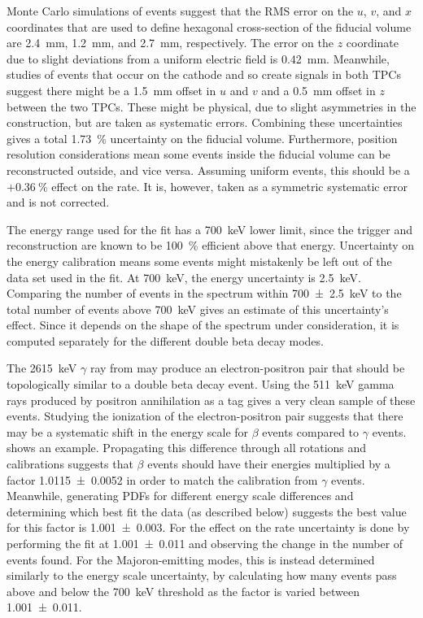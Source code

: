 \documentclass[herrin-thesis.tex]{subfiles}
\begin{document}
Monte Carlo simulations of \twonu{} events suggest that the RMS error on the \(u\), \(v\), and \(x\) coordinates that are used to define hexagonal cross-section of the fiducial volume are \SI{2.4}{\mm}, \SI{1.2}{\mm}, and \SI{2.7}{\mm}, respectively. The error on the \(z\) coordinate due to slight deviations from a uniform electric field is \SI{0.42}{\mm}. Meanwhile, studies of events that occur on the cathode and so create signals in both TPCs suggest there might be a \SI{1.5}{\mm} offset in \(u\) and \(v\) and a \SI{0.5}{\mm} offset in \(z\) between the two TPCs. These might be physical, due to slight asymmetries in the construction, but are taken as systematic errors. Combining these uncertainties gives a total \SI{1.73}{\percent} uncertainty on the fiducial volume. Furthermore, position resolution considerations mean some events inside the fiducial volume can be reconstructed outside, and vice versa. Assuming uniform events, this should be a \(+\SI{0.36}{\percent}\) effect on the rate. It is, however, taken as a symmetric systematic error and is not corrected.

The energy range used for the fit has a \SI{700}{\keV} lower limit, since the trigger and reconstruction are known to be \SI{100}{\percent} efficient above that energy. Uncertainty on the energy calibration means some events might mistakenly be left out of the data set used in the fit. At \SI{700}{\keV}, the energy uncertainty is \SI{2.5}{\keV}. Comparing the number of events in the spectrum within \SI{700\pm2.5}{\keV} to the total number of events above \SI{700}{\keV} gives an estimate of this uncertainty's effect. Since it depends on the shape of the spectrum under consideration, it is computed separately for the different double beta decay modes.

The \SI{2615}{\keV} \(\gamma\) ray from  may produce an electron-positron pair that should be topologically similar to a double beta decay event. Using the \SI{511}{\keV} gamma rays produced by positron annihilation as a tag gives a very clean sample of these events. Studying the ionization of the electron-positron pair suggests that there may be a systematic shift in the energy scale for \(\beta\) events compared to \(\gamma\) events.  shows an example. Propagating this difference through all rotations and calibrations suggests that \(\beta\) events should have their energies multiplied by a factor \num{1.0115\pm0.0052} in order to match the calibration from \(\gamma\) events. Meanwhile, generating PDFs for different energy scale differences and determining which best fit the data (as described below) suggests the best value for this factor is \num{1.001\pm0.003}. For \twonu{} the effect on the rate uncertainty is done by performing the fit at \num{1.001\pm0.011} and observing the change in the number of events found. For the Majoron-emitting modes, this is instead determined similarly to the energy scale uncertainty, by calculating how many events pass above and below the \SI{700}{\keV} threshold as the factor is varied between \num{1.001\pm0.011}.
\end{document}
